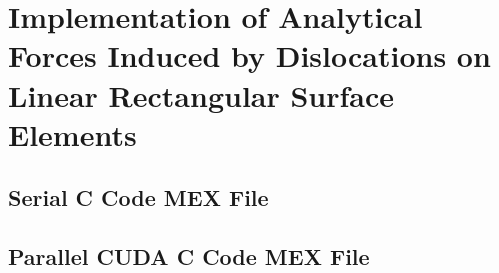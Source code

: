 \chapter{Implementation of Analytical Forces Induced by Dislocations on Linear Rectangular Surface Elements}
\section{Serial C Code MEX File}
\section{Parallel CUDA C Code MEX File}
\savearabiccounter

